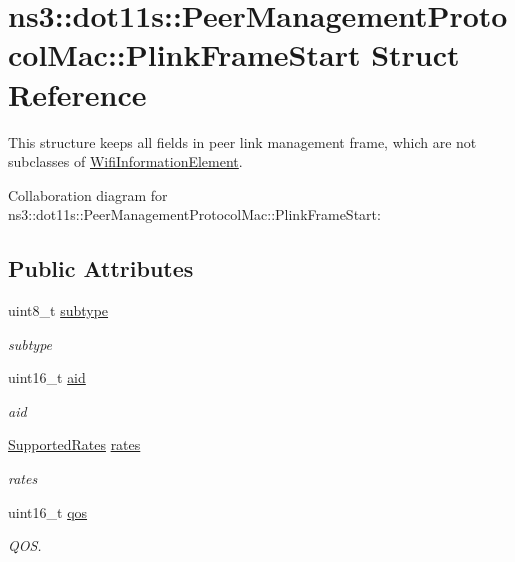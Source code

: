 \hypertarget{structns3_1_1dot11s_1_1PeerManagementProtocolMac_1_1PlinkFrameStart}{}\section{ns3\+:\+:dot11s\+:\+:Peer\+Management\+Protocol\+Mac\+:\+:Plink\+Frame\+Start Struct Reference}
\label{structns3_1_1dot11s_1_1PeerManagementProtocolMac_1_1PlinkFrameStart}


This structure keeps all fields in peer link management frame, which are not subclasses of \hyperlink{classns3_1_1WifiInformationElement}{Wifi\+Information\+Element}.  




Collaboration diagram for ns3\+:\+:dot11s\+:\+:Peer\+Management\+Protocol\+Mac\+:\+:Plink\+Frame\+Start\+:
\subsection*{Public Attributes}
\begin{DoxyCompactItemize}
\item 
uint8\+\_\+t \hyperlink{structns3_1_1dot11s_1_1PeerManagementProtocolMac_1_1PlinkFrameStart_a43bfe58939704c3c247b6f5dd070e1f9}{subtype}
\begin{DoxyCompactList}\small\item\em subtype \end{DoxyCompactList}\item 
uint16\+\_\+t \hyperlink{structns3_1_1dot11s_1_1PeerManagementProtocolMac_1_1PlinkFrameStart_abe34891324c555ce38798bef1a9dac89}{aid}
\begin{DoxyCompactList}\small\item\em aid \end{DoxyCompactList}\item 
\hyperlink{classns3_1_1SupportedRates}{Supported\+Rates} \hyperlink{structns3_1_1dot11s_1_1PeerManagementProtocolMac_1_1PlinkFrameStart_a64600aead58f1ab5c2c5313f7fbeaca3}{rates}
\begin{DoxyCompactList}\small\item\em rates \end{DoxyCompactList}\item 
uint16\+\_\+t \hyperlink{structns3_1_1dot11s_1_1PeerManagementProtocolMac_1_1PlinkFrameStart_aceffb058b6882c3f9d6c32958d069b6e}{qos}
\begin{DoxyCompactList}\small\item\em Q\+OS. \end{DoxyCompactList}\end{DoxyCompactItemize}


